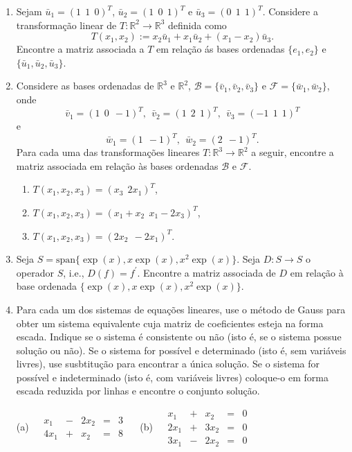 \documentclass{article}
\theoremstyle{plain}
\theoremstyle{obs}
\numberwithin{equation}{section}
\begin{document}
\begin{enumerate}
    \item Sejam $\bar{u}_1=(1 \ \ 1 \ \ 0)^{T}$,   
    $\bar{u}_2=(1 \ \ 0 \ \ 1)^{T}$ e 
    $\bar{u}_3=(0 \ \ 1 \ \ 1)^{T}$.
    Considere a transformação linear de 
    $T:\mathbb{R}^{2}\rightarrow\mathbb{R}^{3}$
    definida como 
    $$T(x_1, x_2):= x_2 \bar{u}_1+x_1 \bar{u}_2+(x_1-x_2)\bar{u}_3.  $$  
    Encontre a matriz associada a $T$ em relação ás bases ordenadas
     $\{e_1,e_2\}$ e 
     $\{\bar{u}_1, \bar{u}_2, \bar{u}_3\}$.
         
   \item Considere as bases ordenadas de $\mathbb{R}^{3}$ e 
   $\mathbb{R}^{2}$, $\mathcal{B}=\{\bar{v}_1, \bar{v}_2, \bar{v}_3\}$ e 
   $\mathcal{F}=\{\bar{w}_1, \bar{w}_2\}$, onde 
    $$
    \bar{v}_1=(1 \ \ 0 \ \ -1)^{T},\ \    
    \bar{v}_2=(1 \ \ 2 \ \ 1)^{T}, \ \  
    \bar{v}_3=(-1 \ \ 1 \ \ 1)^{T}
    $$
    e
    $$
    \bar{w}_1=(1 \ \ -1)^{T},\ \    
    \bar{w}_2=(2 \ \ -1)^{T}. 
    $$
    Para cada uma das transformações lineares $T:\mathbb{R}^{3}\rightarrow\mathbb{R}^{2}$
    a seguir, encontre a matriz associada em  relação às bases ordenadas 
    $\mathcal{B}$ e 
    $\mathcal{F}$.
       \begin{enumerate}
       \item $T(x_1,x_2,x_3)=(x_3 \ \ 2x_1)^{T}$, 
       \item $T(x_1,x_2,x_3)=(x_1+x_2 \ \ x_1-2x_3)^{T}$, 
       \item $T(x_1,x_2,x_3)=(2x_2 \ \ -2x_1)^{T}$.
       \end{enumerate}
    
    \item Seja $S=\text{span}\{\exp(x),x\exp(x),x^2\exp(x)\}$. 
    Seja $D:S \rightarrow S$ o operador $S$, i.e., $D(f)=f^{'}$. 
    Encontre a matriz associada de $D$
    em relação à base ordenada $\{\exp(x),x\exp(x),x^2\exp(x)\}$.
    
   \item Para cada um dos sistemas de equações lineares, use o método de Gauss para obter um sistema
 equivalente cuja matriz de coeficientes esteja na forma escada. 
 Indique se o sistema é consistente ou não (isto é, se o sistema possue solução ou não).
 Se o sistema for possível e determinado (isto é, sem variáveis livres), use susbtitução para encontrar a única 
 solução. Se o sistema for possível e indeterminado (isto é, com variáveis livres) coloque-o em forma escada reduzida 
 por linhas e encontre o conjunto solução.
 
      (a)
      $
      \begin{matrix}
       &x_1& - &2x_2& = &3\\
       &4x_1& + &x_2& = &8
       \end{matrix}
      $
     \ \ (b)
      $
      \begin{matrix}
        &x_1& + &x_2& = &0\\
        &2x_1&+&3x_2&=&0 \\
        &3x_1&-&2x_2&=&0
       \end{matrix}
      $
      

\end{enumerate}
\end{document}
